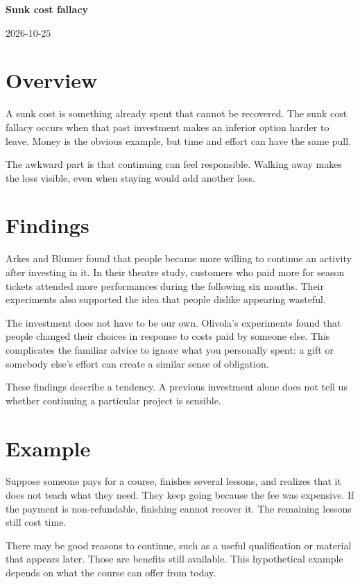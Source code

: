 \documentclass[11pt,a4paper]{article}
\newcommand{\researchtitle}{Sunk cost fallacy}
\newcommand{\researchdate}{2026-10-25}
\begin{document}
{\LARGE\bfseries\researchtitle\par}
\vspace{0.4em}
{\small\researchdate\par}

\section{Overview}

A sunk cost is something already spent that cannot be recovered. The sunk
cost fallacy occurs when that past investment makes an inferior option
harder to leave. Money is the obvious example, but time and effort can have
the same pull. \cite{arkes}

The awkward part is that continuing can feel responsible. Walking away
makes the loss visible, even when staying would add another loss.

\section{Findings}

Arkes and Blumer found that people became more willing to continue an
activity after investing in it. In their theatre study, customers who paid
more for season tickets attended more performances during the following
six months. Their experiments also supported the idea that people dislike
appearing wasteful. \cite{arkes}

The investment does not have to be our own. Olivola's experiments found
that people changed their choices in response to costs paid by someone
else. This complicates the familiar advice to ignore what you personally
spent: a gift or somebody else's effort can create a similar sense of
obligation. \cite{olivola}

These findings describe a tendency. A previous investment alone does not
tell us whether continuing a particular project is sensible.

\section{Example}

Suppose someone pays for a course, finishes several lessons, and realizes
that it does not teach what they need. They keep going because the fee
was expensive. If the payment is non-refundable, finishing cannot recover
it. The remaining lessons still cost time.

There may be good reasons to continue, such as a useful qualification or
material that appears later. Those are benefits still available. This
hypothetical example depends on what the course can offer from today.
\end{document}
